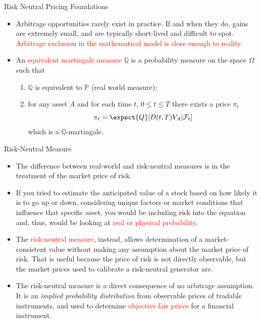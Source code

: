 \documentclass{beamer}
\begin{document}
\begin{frame}{Risk Neutral Pricing Foundations}
	\begin{itemize}
		\item Arbitrage opportunities rarely exist in practice. If and when they do, gains are extremely small, and are typically short-lived and difficult to spot. \textcolor{red}{Arbitrage exclusion in the mathematical model is close enough to reality}.
		\item An \textcolor{red}{equivalent martingale measure} $\mathbb{Q}$ is a probability measure on the space $\Omega$ such that
		\begin{enumerate}
			\item $\mathbb{Q}$ is equivalent to $\mathbb{P}$ (real world measure);
			\item for any asset $A$ and for each time $t$, $0\le t\le T$ there exists a price $\pi_t$
			\begin{equation*}
				\pi_t = \expect{Q}[D(t,T)V_A|\mathcal{F}_t]
			\end{equation*}
			which is a $\mathbb{Q}$-martingale.
		\end{enumerate}
	\end{itemize}
\end{frame}

\begin{frame}{Risk-Neutral Measure}
\begin{itemize}
\item  The difference between real-world and risk-neutral measures is in the treatment of the market price of risk.
\item If you tried to estimate the anticipated value of a stock based on how likely it is to go up or down, considering unique factors or market conditions that influence that specific asset, you would be including risk into the equation and, thus, would be looking at \textcolor{red}{real or physical probability}.
\item The \textcolor{red}{risk-neutral measure}, instead, allows determination of a market-consistent value without making any assumption about the market price of risk. That is useful because the price of risk is not directly observable, but the market prices used to calibrate a risk-neutral generator are.
\item The risk-neutral measure is a direct consequence of no arbitrage assumption. It is an \emph{implied probability distribution} from observable prices of tradable instruments, and used to determine \textcolor{red}{objective fair prices} for a financial instrument.
\end{itemize}
\end{frame}
\end{document}
